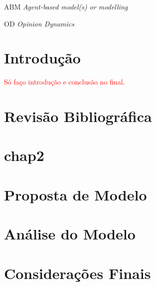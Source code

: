 \documentclass[
12pt,				%
openright,			%
oneside,			%
a4paper,			%
english, %
french, %
spanish, %
brazil %
]{abntex2}
\begin{document}
	
\begin{siglas}
\item[ABM] \textit{Agent-based model(s) or modelling}
  \item[OD] \textit{ Opinion Dynamics}
 
\end{siglas}
	\tableofcontents*
	\cleardoublepage
	\textual
	
	
	
\chapter*[Introdução]{Introdução}
  \textcolor{red}{Só faço introdução e conclusão no final.}
\chapter{Revisão Bibliográfica}





\chapter{chap2}


 


 \chapter{Proposta de Modelo}

 




\chapter{Análise do Modelo}



\chapter*[Considerações Finais]{Considerações Finais}
  
    

	
\postextual
	

	
 \printindex
	
\end{document}
